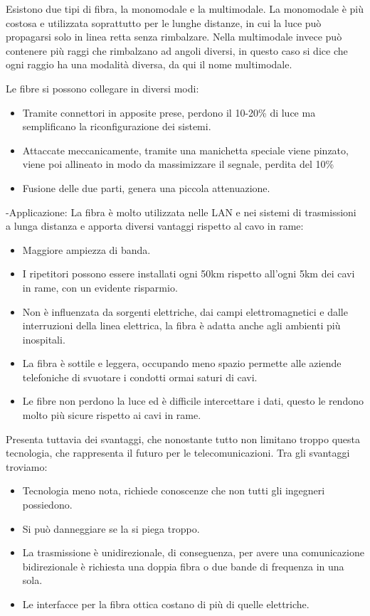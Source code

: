 Esistono due tipi di fibra, la monomodale e la multimodale. La monomodale è più costosa e utilizzata soprattutto per le lunghe distanze, in cui la luce può propagarsi solo in linea retta senza rimbalzare.
Nella multimodale invece può contenere più raggi che rimbalzano ad angoli diversi, in questo caso si dice che ogni raggio ha una modalità diversa, da qui il nome multimodale.

Le fibre si possono collegare in diversi modi:
\begin{itemize}
\item Tramite connettori in apposite prese, perdono il 10-20\% di luce ma semplificano la riconfigurazione dei sistemi. 
\item Attaccate meccanicamente, tramite una manichetta speciale viene pinzato, viene poi allineato in modo da massimizzare il segnale, perdita del 10\% 
\item Fusione delle due parti, genera una piccola attenuazione.
\end{itemize}
-Applicazione: La fibra è molto utilizzata nelle LAN e nei sistemi di trasmissioni a lunga distanza e apporta diversi vantaggi rispetto al cavo in rame:
\begin{itemize}
\item	Maggiore ampiezza di banda.
\item	I ripetitori possono essere installati ogni 50km rispetto all’ogni 5km dei cavi in rame, con un evidente risparmio.
\item	Non è influenzata da sorgenti elettriche, dai campi elettromagnetici e dalle interruzioni della linea elettrica, la fibra è adatta anche agli ambienti più inospitali.
\item	La fibra è sottile e leggera, occupando meno spazio permette alle aziende telefoniche di svuotare i condotti ormai saturi di cavi.
\item	Le fibre non perdono la luce ed è difficile intercettare i dati, questo le rendono molto più sicure rispetto ai cavi in rame.
\end{itemize}
Presenta tuttavia dei svantaggi, che nonostante tutto non limitano troppo questa tecnologia, che rappresenta il futuro per le telecomunicazioni. Tra gli svantaggi troviamo:
\begin{itemize}
\item	Tecnologia meno nota, richiede conoscenze che non tutti gli ingegneri possiedono.
\item	Si può danneggiare se la si piega troppo.
\item	La trasmissione è unidirezionale, di conseguenza, per avere una comunicazione bidirezionale è richiesta una doppia fibra o due bande di frequenza in una sola.
\item	Le interfacce per la fibra ottica costano di più di quelle elettriche.
\end{itemize}


